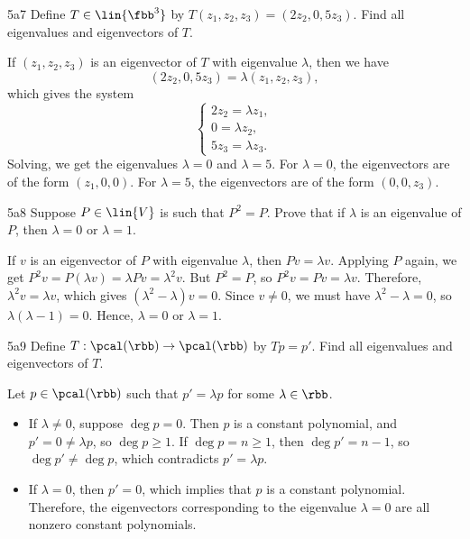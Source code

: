 \begin{exercise}{5a7}
    Define $T \in \lin{\fbb^3}$ by $T(z_1, z_2, z_3) = (2z_2, 0, 5z_3)$.
	Find all eigenvalues and eigenvectors of $T$.
\end{exercise}

\begin{sol}
    If $(z_1, z_2, z_3)$ is an eigenvector of $T$ with eigenvalue $\lambda$, then we have
    \[
        (2z_2, 0, 5z_3) = \lambda (z_1, z_2, z_3),
    \]
    which gives the system
    \[
        \begin{cases}
            2z_2 = \lambda z_1,\\
            0 = \lambda z_2,\\
            5z_3 = \lambda z_3.
        \end{cases}
    \]
    Solving, we get the eigenvalues $\lambda = 0$ and $\lambda = 5$.
	For $\lambda = 0$, the eigenvectors are of the form $(z_1, 0, 0)$.
	For $\lambda = 5$, the eigenvectors are of the form $(0, 0, z_3)$.
\end{sol}

\begin{exercise}{5a8}
    Suppose $P \in \lin{V}$ is such that $P^2 = P$.
	Prove that if $\lambda$ is an eigenvalue of $P$, then $\lambda = 0$ or $\lambda = 1$.
\end{exercise}

\begin{sol}
    If $v$ is an eigenvector of $P$ with eigenvalue $\lambda$, then $Pv = \lambda v$.
	Applying $P$ again, we get $P^2v = P(\lambda v) = \lambda Pv = \lambda^2 v$.
	But $P^2 = P$, so $P^2v = Pv = \lambda v$.
	Therefore, $\lambda^2 v = \lambda v$, which gives $(\lambda^2 - \lambda)v = 0$.
	Since $v \neq 0$, we must have $\lambda^2 - \lambda = 0$, so $\lambda(\lambda - 1) = 0$.
	Hence, $\lambda = 0$ or $\lambda = 1$.
\end{sol}

\begin{exercise}{5a9}
    Define $T: \pcal(\rbb) \to \pcal(\rbb)$ by $Tp = p'$.
	Find all eigenvalues and eigenvectors of $T$.
\end{exercise}

\begin{sol}
    Let $p \in \pcal(\rbb)$ such that $p' = \lambda p$ for some $\lambda \in \rbb$.
    \begin{itemize}
        \item If $\lambda \neq 0$, suppose $\deg p = 0$. Then $p$ is a constant polynomial, and $p' = 0 \neq \lambda p$, so $\deg p \geq 1$.
        If $\deg p = n \geq 1$, then $\deg p' = n - 1$, so $\deg p' \neq \deg p$, which contradicts $p' = \lambda p$.
        \item If $\lambda = 0$, then $p' = 0$, which implies that $p$ is a constant polynomial.
	Therefore, the eigenvectors corresponding to the eigenvalue $\lambda = 0$ are all nonzero constant polynomials. \qedhere
    \end{itemize}
\end{sol}

